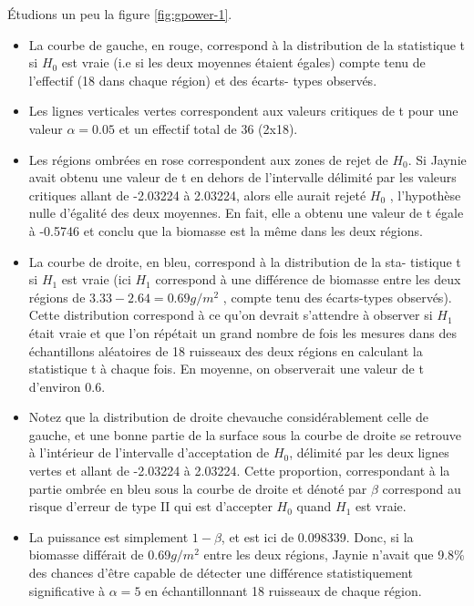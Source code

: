 \documentclass[12pt,]{book}
\providecommand{\tightlist}{%
  \setlength{\itemsep}{0pt}\setlength{\parskip}{0pt}}
\begin{document}
Étudions un peu la figure \ref{fig:gpower-1}.

\begin{itemize}
\tightlist
\item
  La courbe de gauche, en rouge, correspond à la distribution de la statistique t si \(H_0\) est vraie (i.e si les deux moyennes étaient égales) compte tenu de l'effectif (18 dans chaque région) et des écarts- types observés.
\item
  Les lignes verticales vertes correspondent aux valeurs critiques de t pour une valeur \(\alpha = 0.05\) et un effectif total de 36 (2x18).
\item
  Les régions ombrées en rose correspondent aux zones de rejet de \(H_0\).
  Si Jaynie avait obtenu une valeur de t en dehors de l'intervalle délimité par les valeurs critiques allant de -2.03224 à 2.03224, alors elle aurait rejeté \(H_0\) , l'hypothèse nulle d'égalité des deux moyennes.
  En fait, elle a obtenu une valeur de t égale à -0.5746 et conclu que la biomasse est la même dans les deux régions.
\item
  La courbe de droite, en bleu, correspond à la distribution de la sta- tistique t si \(H_1\) est vraie (ici \(H_1\) correspond à une différence de biomasse entre les deux régions de \(3.33-2.64=0.69g/m^2\) , compte tenu des écarts-types observés).
  Cette distribution correspond à ce qu'on devrait s'attendre à observer si \(H_1\) était vraie et que l'on répétait un grand nombre de fois les mesures dans des échantillons aléatoires de 18 ruisseaux des deux régions en calculant la statistique t à chaque fois.
  En moyenne, on observerait une valeur de t d'environ 0.6.
\item
  Notez que la distribution de droite chevauche considérablement celle de gauche, et une bonne partie de la surface sous la courbe de droite se retrouve à l'intérieur de l'intervalle d'acceptation de \(H_0\), délimité par les deux lignes vertes et allant de -2.03224 à 2.03224.
  Cette proportion, correspondant à la partie ombrée en bleu sous la courbe de droite et dénoté par \(\beta\) correspond au risque d'erreur de type II qui est d'accepter \(H_0\) quand \(H_1\) est vraie.
\item
  La puissance est simplement \(1-\beta\), et est ici de 0.098339.
  Donc, si la biomasse différait de 0.69\(g/m^2\) entre les deux régions, Jaynie n'avait que 9.8\% des chances d'être capable de détecter une différence statistiquement significative à \(\alpha=5%
  \) en échantillonnant 18 ruisseaux de chaque région.
\end{itemize}
\end{document}
